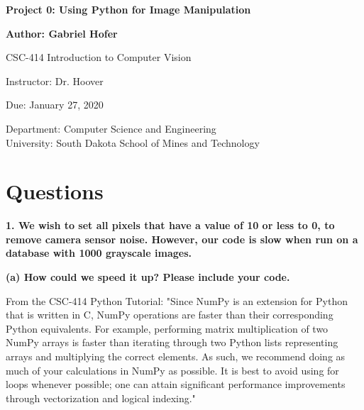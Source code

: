 \documentclass[12pt]{article}
\begin{document}
\begin{titlepage}
   \begin{center}
       \vspace*{1cm}
       \large
       \textbf{Project 0: Using Python for Image Manipulation}
       \normalsize

       \vspace{0.5cm}

       \textbf{Author: Gabriel Hofer}

       \vspace{0.5cm}

       CSC-414 Introduction to Computer Vision

       \vspace{0.5cm}

       Instructor: Dr. Hoover

       \vspace{0.5cm}

       Due: January 27, 2020

       \vfill

       Department: Computer Science and Engineering\\
       University: South Dakota School of Mines and Technology\\
   \end{center}
\end{titlepage}


\newpage
\section{Questions}
\small
\textbf{1. We wish to set all pixels that have a value of 10 or less to 0, to remove camera
sensor noise. However, our code is slow when run on a database with 1000
grayscale images.}

\textbf{(a) How could we speed it up? Please include your code.}

From the CSC-414 Python Tutorial: 
"Since NumPy is an extension for Python that is written in C, NumPy operations are faster than
their corresponding Python equivalents. For example, performing matrix multiplication of two
NumPy arrays is faster than iterating through two Python lists representing arrays and multiplying
the correct elements. As such, we recommend doing as much of your calculations in NumPy
as possible. It is best to avoid using for loops whenever possible; one can attain significant
performance improvements through vectorization and logical indexing."
\end{document}
